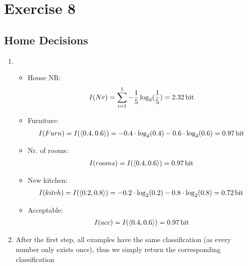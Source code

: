 \documentclass[fleqn,12pt]{scrartcl}
\newcommand{\blattn}{Exercise 8}
\begin{document}
\section*{\blattn}
\setcounter{section}{8}
\subsection{Home Decisions}
\begin{enumerate}
	\item
		\begin{itemize}
			\item  House NR:
				\begin{align*}
					I(Nr) = \sum_{i=1}^5 -\frac15 \log_2(\frac15) = \SI{2.32}{\bit}
				\end{align*}

			\item
				Furniture:
				\begin{align*}
					I(Furn) = I(\langle 0.4, 0.6 \rangle) = -0.4\cdot \log_2(0.4) - 0.6 \cdot \log_2(0.6) = \SI{0.97}{\bit}
				\end{align*}
			\item
				Nr. of rooms:
				\begin{align*}
					I(rooms) = I(\langle 0.4, 0.6 \rangle) = \SI{0.97}{\bit}
				\end{align*}

			\item
				New kitchen:
				\begin{align*}
					I(kitch) = I(\langle 0.2, 0.8 \rangle) = -0.2 \cdot \log_2(0.2) - 0.8 \cdot \log_2(0.8) = \SI{0.72}{\bit}
				\end{align*}

			\item
				Acceptable:
				\begin{align*}
					I(acc) = I(\langle 0.4, 0.6 \rangle) = \SI{0.97}{\bit}
				\end{align*}
		\end{itemize}

	\item After the first step, all examples have the same classification (as every number only exists once), thus we simply return the corresponding classification




\end{enumerate}
\end{document}
